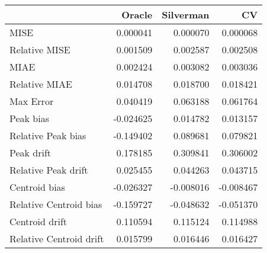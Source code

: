 \begin{tabular}{lrrr}
  \hline
 & Oracle & Silverman & CV \\ 
  \hline
MISE & 0.000041 & 0.000070 & 0.000068 \\ 
  Relative MISE & 0.001509 & 0.002587 & 0.002508 \\ 
  MIAE & 0.002424 & 0.003082 & 0.003036 \\ 
  Relative MIAE & 0.014708 & 0.018700 & 0.018421 \\ 
  Max Error & 0.040419 & 0.063188 & 0.061764 \\ 
  Peak bias & -0.024625 & 0.014782 & 0.013157 \\ 
  Relative Peak bias & -0.149402 & 0.089681 & 0.079821 \\ 
  Peak drift & 0.178185 & 0.309841 & 0.306002 \\ 
  Relative Peak drift & 0.025455 & 0.044263 & 0.043715 \\ 
  Centroid bias & -0.026327 & -0.008016 & -0.008467 \\ 
  Relative Centroid bias & -0.159727 & -0.048632 & -0.051370 \\ 
  Centroid drift & 0.110594 & 0.115124 & 0.114988 \\ 
  Relative Centroid drift & 0.015799 & 0.016446 & 0.016427 \\ 
   \hline
\end{tabular}
